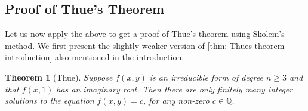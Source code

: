 \documentclass{article}
\newtheorem{theorem}{Theorem}[section]
\newcommand{\mbb}[1]{\mathbb{#1}}
\numberwithin{equation}{section}
\begin{document}

\subsection{Proof of Thue's Theorem}
Let us now apply the above to get a proof of Thue's theorem using Skolem's method. We first present the slightly weaker version of \cref{thm: Thues theorem introduction} also mentioned in the introduction.

\begin{theorem}[Thue]\label{thm: Thues theorem}
	Suppose $f(x,y)$ is an irreducible form of degree $n \geq 3$ and that $f(x,1)$ has an imaginary root. Then there are only finitely many integer solutions to the equation $f(x,y) = c$, for any non-zero $c \in \mbb{Q}$.
\end{theorem}
\end{document}
